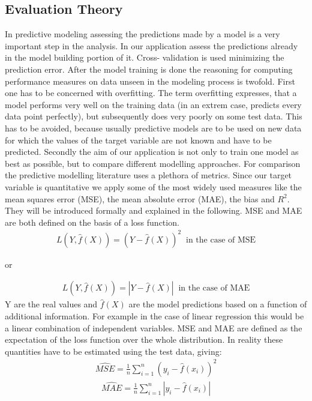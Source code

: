 \subsection{Evaluation Theory}
In predictive modeling assessing the predictions made by a model is a very important step in the analysis. In our application assess the predictions already in the model building portion of it. Cross- validation is used minimizing the prediction error. After the model training is done the reasoning for computing performance measures on data unseen in the modeling process is twofold. First one has to be concerned with overfitting. The term overfitting expresses, that a model performs very well on the training data (in an extrem case, predicts every data point perfectly), but subsequently does very poorly on some test data. This has to be avoided, because usually predictive models are to be used on new data for which the values of the target variable are not known and have to be predicted. Secondly the aim of our application is not only to train one model as best as possible, but to compare different modelling approaches. For comparison the predictive modelling literature uses a plethora of metrics. Since our target variable is quantitative we apply some of the most widely used measures like the mean squares error (MSE), the mean absolute error (MAE), the bias and $R^2$. They will be introduced formally and explained in the following. MSE and MAE are both defined on the basis of a loss function. 
\begin{align*}
L(Y,\hat{f}(X))=(Y-\hat{f}(X))^2\;\; \text{in the case of MSE}
\end{align*}
\begin{center}
or
\end{center}
\begin{align*}
L(Y,\hat{f}(X))=|Y-\hat{f}(X)|\;\; \text{in the case of MAE}
\end{align*}
Y are the real values and $\hat{f}(X)$ are the model predictions based on a function of additional information. For example in the case of linear regression this would be a linear combination of independent variables. MSE and MAE are defined as the expectation of the loss function over the whole distribution. In reality these quantities have to be estimated using the test data, giving:
\begin{align}
\hat{MSE}=\frac{1}{n}\sum_{i=1}^n(y_i-\hat{f}(x_i))^2
\end{align}
\begin{align}
\hat{MAE}=\frac{1}{n}\sum_{i=1}^n|y_i-\hat{f}(x_i)|
\end{align}

